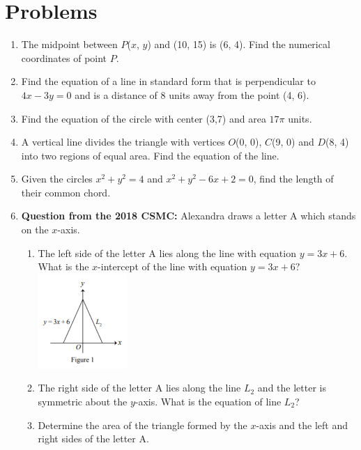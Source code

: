 \documentclass[12pt]{extarticle}
\begin{document}
\section{Problems}
\begin{enumerate}
    \itemsep 2.0em
    \item {The midpoint between $P$($x$, $y$) and (10, 15) is (6, 4). Find the numerical coordinates of point $P$.} %
    \item {Find the equation of a line in standard form that is perpendicular to $4x - 3y = 0$ and is a distance of 8 units away from the point (4, 6).} %
    \item {Find the equation of the circle with center (3,7) and area $17\pi$ units.} %
    \item {A vertical line divides the triangle with vertices $O$(0, 0), $C$(9, 0) and $D$(8, 4) into two regions of equal area. Find the equation of the line.} %
    \item {Given the circles $x^2 + y^2 = 4$ and $x^2 + y^2 - 6x + 2 = 0$, find the length of their common chord.} %
    \item {\textbf{Question from the 2018 CSMC:} Alexandra draws a letter A which stands on the $x$-axis.
    \begin{enumerate}
        \itemsep 1.5em
        \item {The left side of the letter A lies along the line with equation $y = 3x + 6$. What is the $x$-intercept of the line with equation $y = 3x + 6?$\\
        \includegraphics{CSMC2018_B1a.png}} %
        \item {The right side of the letter A lies along the line $L_2$ and the letter is symmetric about the $y$-axis. What is the equation of line $L_2$?} %
        \item {Determine the area of the triangle formed by the $x$-axis and the left and right sides of the letter A.} %

\end{enumerate}}
\end{enumerate}
\end{document}
